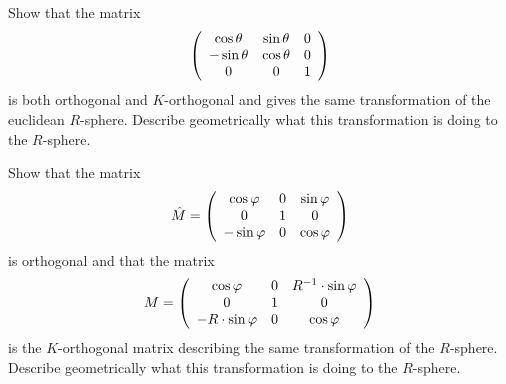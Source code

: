 \documentclass{ximera}
\begin{document}
\begin{exercise}
 Show that the matrix%
\[
\left(
\begin{array}
[c]{ccc}%
\cos \theta & \sin \theta & 0\\
-\sin \theta & \cos \theta & 0\\
0 & 0 & 1
\end{array}
\right)
\]
is both orthogonal and $K$-orthogonal and gives the same transformation of the
euclidean $R$-sphere. Describe geometrically what this transformation is doing
to the $R$-sphere.
\end{exercise}

\begin{exercise}
 Show that the matrix%
\[
\hat{M}=\left(
\begin{array}
[c]{ccc}%
\cos \varphi & 0 & \sin \varphi\\
0 & 1 & 0\\
-\sin \varphi & 0 & \cos \varphi
\end{array}
\right)
\]
is orthogonal and that the matrix%
\[
M=\left(
\begin{array}
[c]{ccc}%
\cos \varphi & 0 & R^{-1}\cdot \sin %
\varphi\\
0 & 1 & 0\\
-R\cdot \sin \varphi & 0 & \cos \varphi
\end{array}
\right)
\]
is the $K$-orthogonal matrix describing the same transformation of the
$R$-sphere. Describe geometrically what this transformation is doing to the
$R$-sphere.
\end{exercise}
\end{document}
